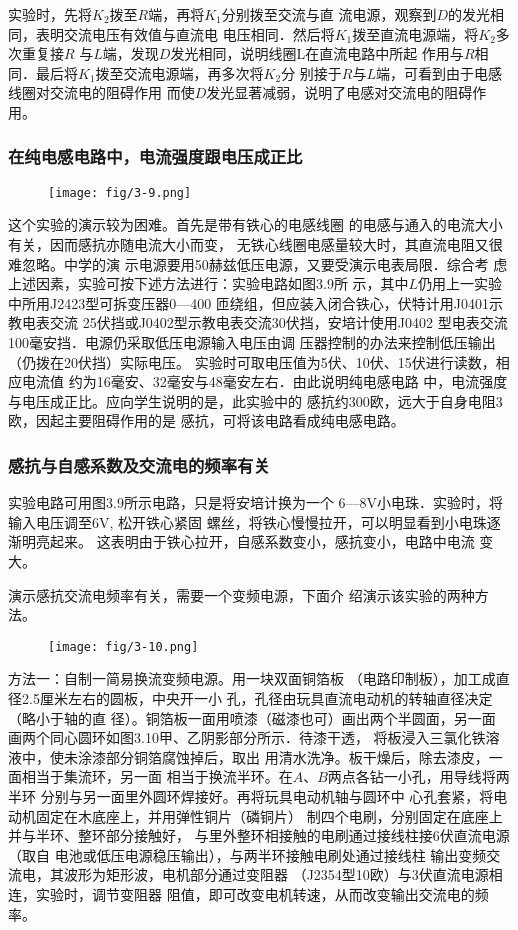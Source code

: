 实验时，先将$K_2$拨至$R$端，再将$K_1$分别拨至交流与直
流电源，观察到$D$的发光相同，表明交流电压有效值与直流电
电压相同．然后将$K_1$拨至直流电源端，将$K_2$多次重复接$R$
与$L$端，发现$D$发光相同，说明线圈L在直流电路中所起
作用与$R$相同．最后将$K_1$拨至交流电源端，再多次将$K_2$分
别接于$R$与$L$端，可看到由于电感线圈对交流电的阻碍作用
而使$D$发光显著减弱，说明了电感对交流电的阻碍作用。

\subsubsection{在纯电感电路中，电流强度跟电压成正比}
\begin{figure}[htp]
    \centering
\texttt{[image: fig/3-9.png]}
    \caption{}
\end{figure}

这个实验的演示较为困难。首先是带有铁心的电感线圈
的电感与通入的电流大小有关，因而感抗亦随电流大小而变，
无铁心线圈电感量较大时，其直流电阻又很难忽略。中学的演
示电源要用50赫兹低压电源，又要受演示电表局限．综合考
虑上述因素，实验可按下述方法进行：实验电路如图3.9所
示，其中$L$仍用上一实验中所用J2423型可拆变压器0—400
匝绕组，但应装入闭合铁心，伏特计用J0401示教电表交流
25伏挡或J0402型示教电表交流30伏挡，安培计使用J0402
型电表交流100毫安挡．电源仍采取低压电源输入电压由调
压器控制的办法来控制低压输出（仍拨在20伏挡）实际电压。
实验时可取电压值为5伏、10伏、15伏进行读数，相应电流值
约为16毫安、32毫安与48毫安左右．由此说明纯电感电路
中，电流强度与电压成正比。应向学生说明的是，此实验中的
感抗约300欧，远大于自身电阻3欧，因起主要阻碍作用的是
感抗，可将该电路看成纯电感电路。

\subsubsection{感抗与自感系数及交流电的频率有关}
实验电路可用图3.9所示电路，只是将安培计换为一个
6—8V小电珠．实验时，将输入电压调至6V, 松开铁心紧固
螺丝，将铁心慢慢拉开，可以明显看到小电珠逐渐明亮起来。
这表明由于铁心拉开，自感系数变小，感抗变小，电路中电流
变大。

演示感抗交流电频率有关，需要一个变频电源，下面介
绍演示该实验的两种方法。

\begin{figure}[htp]
    \centering
\texttt{[image: fig/3-10.png]}
    \caption{}
\end{figure}

方法一：自制一简易换流变频电源。用一块双面铜箔板
（电路印制板），加工成直径2.5厘米左右的圆板，中央开一小
孔，孔径由玩具直流电动机的转轴直径决定（略小于轴的直
径）。铜箔板一面用喷漆（磁漆也可）画出两个半圆面，另一面
画两个同心圆环如图3.10甲、乙阴影部分所示．待漆干透，
将板浸入三氯化铁溶液中，使未涂漆部分铜箔腐蚀掉后，取出
用清水洗净。板干燥后，除去漆皮，一面相当于集流环，另一面
相当于换流半环。在$A$、$B$两点各钻一小孔，用导线将两半环
分别与另一面里外圆环焊接好。再将玩具电动机轴与圆环中
心孔套紧，将电动机固定在木底座上，并用弹性铜片（磷铜片）
制四个电刷，分别固定在底座上并与半环、整环部分接触好，
与里外整环相接触的电刷通过接线柱接6伏直流电源（取自
电池或低压电源稳压输出），与两半环接触电刷处通过接线柱
输出变频交流电，其波形为矩形波，电机部分通过变阻器
（J2354型10欧）与3伏直流电源相连，实验时，调节变阻器
阻值，即可改变电机转速，从而改变输出交流电的频率。

